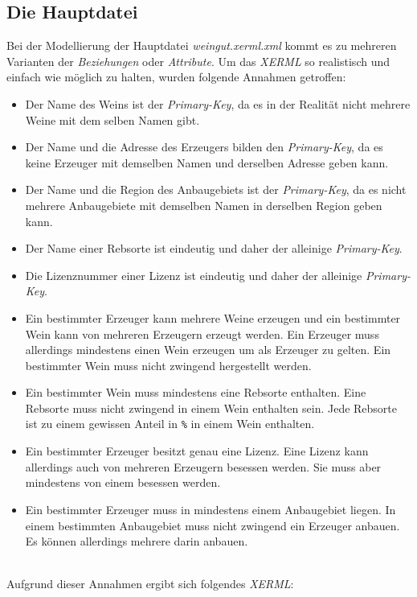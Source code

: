 \subsection{Die Hauptdatei}
\hon{}

\noindent
Bei der Modellierung der Hauptdatei \textit{weingut.xerml.xml} kommt es zu mehreren Varianten der \textit{Beziehungen} oder \textit{Attribute}. Um das \textit{XERML} so realistisch und einfach wie möglich zu halten, wurden folgende Annahmen getroffen:
\begin{itemize}
	\item Der Name des Weins ist der \textit{Primary-Key}, da es in der Realität nicht mehrere Weine mit dem selben Namen gibt. 
	\item Der Name und die Adresse des Erzeugers bilden den \textit{Primary-Key}, da es keine Erzeuger mit demselben Namen und derselben Adresse geben kann.
	\item Der Name und die Region des Anbaugebiets ist der \textit{Primary-Key}, da es nicht mehrere Anbaugebiete mit demselben Namen in derselben Region geben kann.
	\item Der Name einer Rebsorte ist eindeutig und daher der alleinige \textit{Primary-Key}. 
	\item Die Lizenznummer einer Lizenz ist eindeutig und daher der alleinige \textit{Primary-Key}.
	
	\item Ein bestimmter Erzeuger kann mehrere Weine erzeugen und ein bestimmter Wein kann von mehreren Erzeugern erzeugt werden. Ein Erzeuger muss allerdings mindestens einen Wein erzeugen um als Erzeuger zu gelten. Ein bestimmter Wein muss nicht zwingend hergestellt werden.
	\item Ein bestimmter Wein muss mindestens eine Rebsorte enthalten. Eine Rebsorte muss nicht zwingend in einem Wein enthalten sein. Jede Rebsorte ist zu einem gewissen Anteil in \verb|%| in einem Wein enthalten. 
	\item Ein bestimmter Erzeuger besitzt genau eine Lizenz. Eine Lizenz kann allerdings auch von mehreren Erzeugern besessen werden. Sie muss aber mindestens von einem besessen werden. 
	\item Ein bestimmter Erzeuger muss in mindestens einem Anbaugebiet liegen. In einem bestimmten Anbaugebiet muss nicht zwingend ein Erzeuger anbauen. Es können allerdings mehrere darin anbauen.
\end{itemize}
\noindent
\hon{}
\\
\noindent 
Aufgrund dieser Annahmen ergibt sich folgendes \textit{XERML}:


